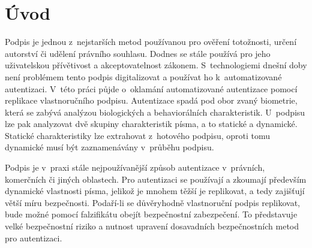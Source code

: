 
%

\chapter{Úvod}
Podpis je jednou z~nejstarších metod používanou pro ověření totožnosti, určení autorství či udělení právního souhlasu.
Dodnes se stále používá pro jeho uživatelskou přívětivost a akceptovatelnost zákonem.
S~technologiemi dnešní doby není problémem tento podpis digitalizovat a používat ho k~automatizované autentizaci.
V~této práci půjde o~oklamání automatizované autentizace pomocí replikace vlastnoručního podpisu.
Autentizace spadá pod obor zvaný biometrie, která se zabývá analýzou biologických a behaviorálních charakteristik. 
U~podpisu lze pak analyzovat dvě skupiny charakteristik písma, a to statické a dynamické. 
Statické charakteristiky lze extrahovat z~hotového podpisu, oproti tomu dynamické musí být zaznamenávány v~průběhu podpisu.

Podpis je v~praxi stále nejpoužívanější způsob autentizace v~právních, komerčních či jiných oblastech. 
Pro autentizaci se používají a zkoumají především dynamické vlastnosti písma, jelikož je mnohem těžší je replikovat, a tedy zajišťují větší míru bezpečnosti.
Podaří-li se důvěryhodně vlastnoruční podpis replikovat, bude možné pomocí falzifikátu obejít bezpečnostní zabezpečení. 
To představuje velké bezpečnostní riziko a nutnost upravení dosavadních bezpečnostních metod pro autentizaci. 




